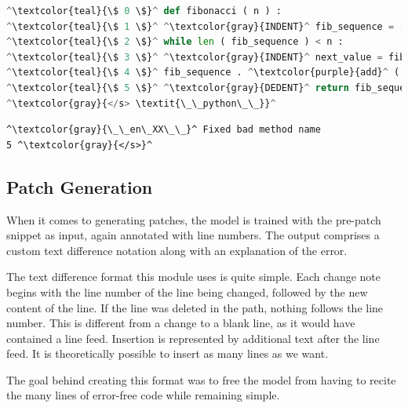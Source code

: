         \begin{minipage}{.45\textwidth}
            \begin{lstlisting}[language=Python, caption={Example of code in listing \ref{lst:error} formatted as an input for error detection. Italics denote global attention.}]
^\textcolor{teal}{\$ 0 \$}^ def fibonacci ( n ) : 
^\textcolor{teal}{\$ 1 \$}^ ^\textcolor{gray}{INDENT}^ fib_sequence = [ 0 , 1 ] 
^\textcolor{teal}{\$ 2 \$}^ while len ( fib_sequence ) < n :
^\textcolor{teal}{\$ 3 \$}^ ^\textcolor{gray}{INDENT}^ next_value = fib_sequence [ - 1 ] + fib_sequence [ - 2 ]
^\textcolor{teal}{\$ 4 \$}^ fib_sequence . ^\textcolor{purple}{add}^ ( next\_value )
^\textcolor{teal}{\$ 5 \$}^ ^\textcolor{gray}{DEDENT}^ return fib_sequence [ : n ]
^\textcolor{gray}{</s> \textit{\_\_python\_\_}}^
            \end{lstlisting}
        \end{minipage}
        \hfill
        \begin{minipage}{.45\textwidth}
            \begin{lstlisting}[caption={Code in listing \ref{lst:error} formatted as a label for error detection.}]
^\textcolor{gray}{\_\_en\_XX\_\_}^ Fixed bad method name
5 ^\textcolor{gray}{</s>}^
            \end{lstlisting}
        \end{minipage}
        
    \subsection{Patch Generation}
    
        When it comes to generating patches, the model is trained with the pre-patch snippet as input, again annotated with line numbers. The output comprises a custom text difference notation along with an explanation of the error.
        
        The text difference format this module uses is quite simple. Each change note begins with the line number of the line being changed, followed by the new content of the line. If the line was deleted in the path, nothing follows the line number. This is different from a change to a blank line, as it would have contained a line feed. Insertion is represented by additional text after the line feed. It is theoretically possible to insert as many lines as we want.
        
        The goal behind creating this format was to free the model from having to recite the many lines of error-free code while remaining simple. 
        
